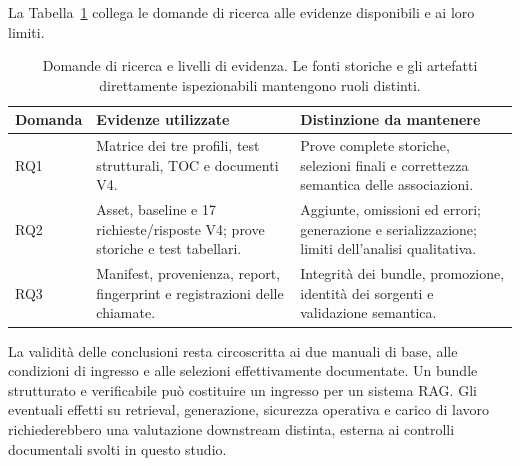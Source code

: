 La Tabella~\ref{tab:rq-evidenze} collega le domande di ricerca alle evidenze disponibili e ai loro limiti.

\begin{table}[!htbp]
\centering
\caption{Domande di ricerca e livelli di evidenza. Le fonti storiche e gli artefatti direttamente ispezionabili mantengono ruoli distinti.}
\label{tab:rq-evidenze}
\small
\begin{tabularx}{\textwidth}{@{}p{}XX@{}}
\toprule
Domanda & Evidenze utilizzate & Distinzione da mantenere \\
\midrule
RQ1 & Matrice dei tre profili, test strutturali, TOC e documenti V4. & Prove complete storiche, selezioni finali e correttezza semantica delle associazioni. \tabularnewline
RQ2 & Asset, baseline e 17 richieste/risposte V4; prove storiche e test tabellari. & Aggiunte, omissioni ed errori; generazione e serializzazione; limiti dell'analisi qualitativa. \tabularnewline
RQ3 & Manifest, provenienza, report, fingerprint e registrazioni delle chiamate. & Integrità dei bundle, promozione, identità dei sorgenti e validazione semantica. \tabularnewline
\bottomrule
\end{tabularx}
\end{table}

La validità delle conclusioni resta circoscritta ai due manuali di base, alle condizioni di ingresso e alle selezioni effettivamente documentate. Un bundle strutturato e verificabile può costituire un ingresso per un sistema RAG. Gli eventuali effetti su retrieval, generazione, sicurezza operativa e carico di lavoro richiederebbero una valutazione downstream distinta, esterna ai controlli documentali svolti in questo studio.